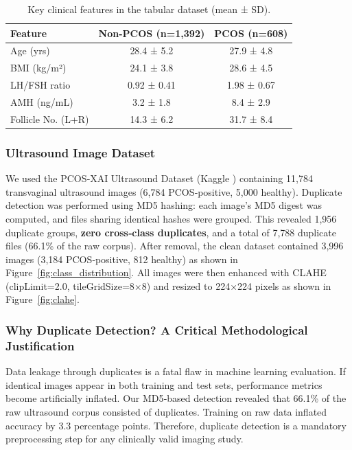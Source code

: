 \documentclass[conference]{IEEEtran}
\begin{document}
\begin{table}[htbp]
\caption{Key clinical features in the tabular dataset (mean ± SD).}
\centering
\begin{tabular}{lcc}
\hline
\textbf{Feature} & \textbf{Non-PCOS (n=1,392)} & \textbf{PCOS (n=608)} \\
\hline
Age (yrs) & 28.4 ± 5.2 & 27.9 ± 4.8 \\
BMI (kg/m²) & 24.1 ± 3.8 & 28.6 ± 4.5 \\
LH/FSH ratio & 0.92 ± 0.41 & 1.98 ± 0.67 \\
AMH (ng/mL) & 3.2 ± 1.8 & 8.4 ± 2.9 \\
Follicle No. (L+R) & 14.3 ± 6.2 & 31.7 ± 8.4 \\
\hline
\end{tabular}
\end{table}

\subsubsection{Ultrasound Image Dataset}
We used the PCOS‑XAI Ultrasound Dataset (Kaggle \cite{PCOSultrasoundKaggle}) containing 11,784 transvaginal ultrasound images (6,784 PCOS‑positive, 5,000 healthy). Duplicate detection was performed using MD5 hashing: each image’s MD5 digest was computed, and files sharing identical hashes were grouped. This revealed 1,956 duplicate groups, \textbf{zero cross‑class duplicates}, and a total of 7,788 duplicate files (66.1\% of the raw corpus). After removal, the clean dataset contained 3,996 images (3,184 PCOS‑positive, 812 healthy) as shown in Figure~\ref{fig:class_distribution}. All images were then enhanced with CLAHE (clipLimit=2.0, tileGridSize=8×8) and resized to 224×224 pixels as shown in Figure~\ref{fig:clahe}.

\subsubsection{Why Duplicate Detection? A Critical Methodological Justification}
Data leakage through duplicates is a fatal flaw in machine learning evaluation. If identical images appear in both training and test sets, performance metrics become artificially inflated. Our MD5‑based detection revealed that 66.1\% of the raw ultrasound corpus consisted of duplicates. Training on raw data inflated accuracy by 3.3 percentage points. Therefore, duplicate detection is a mandatory preprocessing step for any clinically valid imaging study.
\end{document}
